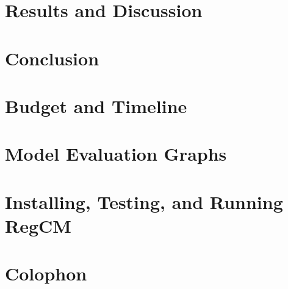 %	

\chapter{Results and Discussion}
	\Mprintcontents
	\label{ch:results}
	
	\stopcontents[chapters]
	\clearpage
	
\chapter{Conclusion}
	\Mprintcontents
	\label{ch:conclusion}
	
	\stopcontents[chapters]
	\clearpage


\printbibliography

\clearpage

\appendix
\chapter{Budget and Timeline}
	\label{app:budget-timeline}
	
	
\chapter{Model Evaluation Graphs}
	\label{app:model-evaluation-graphs}
	
	
\chapter{Installing, Testing, and Running RegCM}
	\label{app:regcm-install-run}
	

\backmatter
\chapter{Colophon}
	



